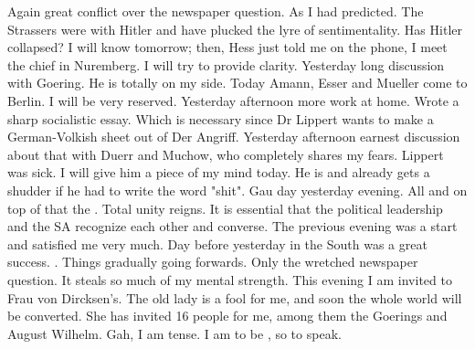 Again great conflict over the newspaper question. As I had predicted. The Strassers were with Hitler and have plucked the lyre of sentimentality. Has Hitler collapsed? I will know tomorrow; then, Hess just told me on the phone, I meet the chief in Nuremberg. I will try to provide clarity. Yesterday long discussion with Goering. He is totally on my side. Today Amann, Esser and Mueller come to Berlin. I will be very reserved. Yesterday afternoon more work at home. Wrote a sharp socialistic essay. Which is necessary since Dr Lippert wants to make a German-Volkish sheet out of Der Angriff. Yesterday afternoon earnest discussion about that with Duerr and Muchow, who completely shares my fears. Lippert was sick. I will give him a piece of my mind today. He is \missing and already gets a shudder if he had to write the word "shit". Gau day yesterday evening. All  and \missing on top of that the . Total unity reigns. It is essential that the political leadership and the SA recognize each other and converse. The previous evening was a start and satisfied me very much. Day before yesterday in the South was a great success. . Things gradually going forwards. Only the wretched newspaper question. It steals so much of my mental strength. This evening I am invited to Frau von Dircksen's. The old lady is a fool for me, and soon the whole world will be converted. She has invited 16 people for me, among them the Goerings and August Wilhelm. Gah, I am tense. I am to be , so to speak.